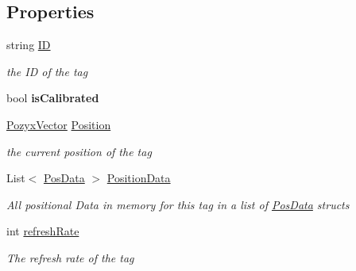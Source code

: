 \subsection*{Properties}
\begin{DoxyCompactItemize}
\item 
string \hyperlink{class_pozyx_positioner_1_1_framework_1_1_tag_a0d75eeca4dea7088e2b4a60230c13012}{ID}
\begin{DoxyCompactList}\small\item\em the ID of the tag \end{DoxyCompactList}\item 
\mbox{\label{class_pozyx_positioner_1_1_framework_1_1_tag_a02cdde9c3303a18f28453056939bf045}} 
bool {\bfseries is\+Calibrated}
\item 
\hyperlink{struct_pozyx_positioner_1_1_framework_1_1_pozyx_vector}{Pozyx\+Vector} \hyperlink{class_pozyx_positioner_1_1_framework_1_1_tag_a0b1b836b4e64ae70171587a2bcde4d71}{Position}
\begin{DoxyCompactList}\small\item\em the current position of the tag \end{DoxyCompactList}\item 
List$<$ \hyperlink{struct_pozyx_positioner_1_1_framework_1_1_pos_data}{Pos\+Data} $>$ \hyperlink{class_pozyx_positioner_1_1_framework_1_1_tag_afb5b4baf9218efdddde17b8390408aa7}{Position\+Data}
\begin{DoxyCompactList}\small\item\em All positional Data in memory for this tag in a list of \hyperlink{struct_pozyx_positioner_1_1_framework_1_1_pos_data}{Pos\+Data} structs \end{DoxyCompactList}\item 
int \hyperlink{class_pozyx_positioner_1_1_framework_1_1_tag_a9010e57016df0a932c5ce8f8584ff5f9}{refresh\+Rate}
\begin{DoxyCompactList}\small\item\em The refresh rate of the tag \end{DoxyCompactList}\end{DoxyCompactItemize}


